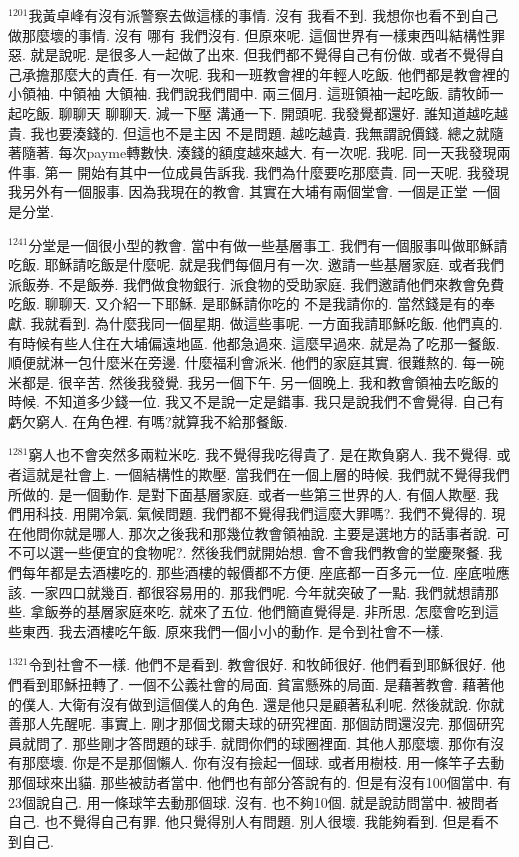 \documentclass{book}
\begin{document}
$^{1201}$我黃卓峰有沒有派警察去做這樣的事情.
沒有 我看不到.
我想你也看不到自己做那麼壞的事情.
沒有 哪有 我們沒有.
但原來呢.
這個世界有一樣東西叫結構性罪惡.
就是說呢.
是很多人一起做了出來.
但我們都不覺得自己有份做.
或者不覺得自己承擔那麼大的責任.
有一次呢.
我和一班教會裡的年輕人吃飯.
他們都是教會裡的小領袖.
中領袖 大領袖.
我們說我們間中.
兩三個月.
這班領袖一起吃飯.
請牧師一起吃飯.
聊聊天 聊聊天.
減一下壓 溝通一下.
開頭呢.
我發覺都還好.
誰知道越吃越貴.
我也要湊錢的.
但這也不是主因 不是問題.
越吃越貴.
我無謂說價錢.
總之就隨著隨著.
每次payme轉數快.
湊錢的額度越來越大.
有一次呢.
我呢.
同一天我發現兩件事.
第一 開始有其中一位成員告訴我.
我們為什麼要吃那麼貴.
同一天呢.
我發現我另外有一個服事.
因為我現在的教會.
其實在大埔有兩個堂會.
一個是正堂 一個是分堂.

$^{1241}$分堂是一個很小型的教會.
當中有做一些基層事工.
我們有一個服事叫做耶穌請吃飯.
耶穌請吃飯是什麼呢.
就是我們每個月有一次.
邀請一些基層家庭.
或者我們派飯券.
不是飯券.
我們做食物銀行.
派食物的受助家庭.
我們邀請他們來教會免費吃飯.
聊聊天.
又介紹一下耶穌.
是耶穌請你吃的 不是我請你的.
當然錢是有的奉獻.
我就看到.
為什麼我同一個星期.
做這些事呢.
一方面我請耶穌吃飯.
他們真的.
有時候有些人住在大埔偏遠地區.
他都急過來.
這麼早過來.
就是為了吃那一餐飯.
順便就淋一包什麼米在旁邊.
什麼福利會派米.
他們的家庭其實.
很難熬的.
每一碗米都是.
很辛苦.
然後我發覺.
我另一個下午.
另一個晚上.
我和教會領袖去吃飯的時候.
不知道多少錢一位.
我又不是說一定是錯事.
我只是說我們不會覺得.
自己有虧欠窮人.
在角色裡.
有嗎?就算我不給那餐飯.

$^{1281}$窮人也不會突然多兩粒米吃.
我不覺得我吃得貴了.
是在欺負窮人.
我不覺得.
或者這就是社會上.
一個結構性的欺壓.
當我們在一個上層的時候.
我們就不覺得我們所做的.
是一個動作.
是對下面基層家庭.
或者一些第三世界的人.
有個人欺壓.
我們用科技.
用開冷氣.
氣候問題.
我們都不覺得我們這麼大罪嗎?.
我們不覺得的.
現在他問你就是哪人.
那次之後我和那幾位教會領袖說.
主要是選地方的話事者說.
可不可以選一些便宜的食物呢?.
然後我們就開始想.
會不會我們教會的堂慶聚餐.
我們每年都是去酒樓吃的.
那些酒樓的報價都不方便.
座底都一百多元一位.
座底啦應該.
一家四口就幾百.
都很容易用的.
那我們呢.
今年就突破了一點.
我們就想請那些.
拿飯券的基層家庭來吃.
就來了五位.
他們簡直覺得是.
非所思.
怎麼會吃到這些東西.
我去酒樓吃午飯.
原來我們一個小小的動作.
是令到社會不一樣.

$^{1321}$令到社會不一樣.
他們不是看到.
教會很好.
和牧師很好.
他們看到耶穌很好.
他們看到耶穌扭轉了.
一個不公義社會的局面.
貧富懸殊的局面.
是藉著教會.
藉著他的僕人.
大衛有沒有做到這個僕人的角色.
還是他只是顧著私利呢.
然後就說.
你就善那人先醒呢.
事實上.
剛才那個戈爾夫球的研究裡面.
那個訪問還沒完.
那個研究員就問了.
那些剛才答問題的球手.
就問你們的球圈裡面.
其他人那麼壞.
那你有沒有那麼壞.
你是不是那個懶人.
你有沒有撿起一個球.
或者用樹枝.
用一條竿子去動那個球來出貓.
那些被訪者當中.
他們也有部分答說有的.
但是有沒有100個當中.
有23個說自己.
用一條球竿去動那個球.
沒有.
也不夠10個.
就是說訪問當中.
被問者自己.
也不覺得自己有罪.
他只覺得別人有問題.
別人很壞.
我能夠看到.
但是看不到自己.
\end{document}
